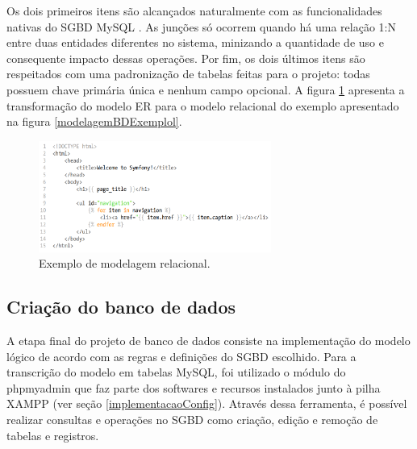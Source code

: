 \documentclass[cic,tc]{iiufrgs}
\begin{document}
Os dois primeiros itens são alcançados naturalmente com as funcionalidades nativas do SGBD MySQL \cite{sqlCompleteBook}. As junções só ocorrem quando há uma relação 1:N entre duas entidades diferentes no sistema, minizando a quantidade de uso e consequente impacto dessas operações. Por fim, os dois últimos itens são respeitados com uma padronização de tabelas feitas para o projeto: todas possuem chave primária única e nenhum campo opcional. A figura \ref{modelagemBDLogicoExemplol} apresenta a transformação do modelo ER para o modelo relacional do exemplo apresentado na figura \ref{modelagemBDExemplol}.

\begin{figure}[h]
    \caption{Exemplo de modelagem relacional.}
        \begin{center}
            \includegraphics[width=0.68\textwidth]{figuras/twig-symf.png}
        \end{center}
    \label{modelagemBDLogicoExemplol}
\end{figure}

\subsection{Criação do banco de dados}
\label{BDCriacao}

A etapa final do projeto de banco de dados consiste na implementação do modelo lógico de acordo com as regras e definições do SGBD escolhido. Para a transcrição do modelo em tabelas MySQL, foi utilizado o módulo do phpmyadmin que faz parte dos softwares e recursos instalados junto à pilha XAMPP (ver seção \ref{implementacaoConfig}). Através dessa ferramenta, é possível realizar consultas e  operações no SGBD como criação, edição e remoção de tabelas e registros.
\end{document}
